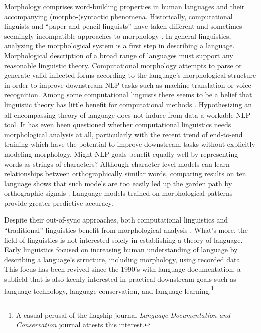 \documentclass[12pt]{article}
\begin{document}
Morphology comprises word-building properties in human languages and their accompanying (morpho-)syntactic phenomena. Historically, computational linguists and ``paper-and-pencil linguists'' have taken different and sometimes seemingly incompatible approaches to morphology \cite[page 80]{karttunen_2005}. In general linguistics, analyzing the morphological system is a first step in describing a language. Morphological description of a broad range of languages must support any reasonable linguistic theory. Computational morphology attempts to parse or generate valid inflected forms according to the language's morphological structure in order to improve downstream NLP tasks such as machine translation or voice recognition. Among some computational linguists there seems to be a belief that linguistic theory has little benefit for computational methods \cite{goldsmith_computational_2017}. Hypothesizing an all-encompassing theory of language does not induce from data a workable NLP tool. It has even been questioned whether computational linguistics needs morphological analysis at all, particularly with the recent trend of end-to-end training which have the potential to improve downstream tasks without explicitly modeling morphology. Might NLP goals benefit equally well by representing words as strings of characters? Although character-level models can learn relationships between orthographically similar words, comparing results on ten language shows that such models are too easily led up the garden path by orthographic signals \cite{vania_characters_2017}. Language models trained on morphological patterns provide greater predictive accuracy.  

Despite their out-of-sync approaches, both computational linguistics and ``traditional'' linguistics benefit from morphological analysis \cite[page 165]{cotterell_labeled_2015}. What's more, the field of linguistics is not interested solely in establishing a theory of language. Early linguistics focused on increasing human understanding of language by describing a language's structure, including morphology, using recorded data. This focus has been revived since the 1990's with language documentation, a subfield that is also keenly interested in practical downstream goals such as language technology, language conservation, and language learning.\footnote{A casual perusal of the flagship journal \textit{Language Documentation and Conservation} journal attests this interest.}
\end{document}
